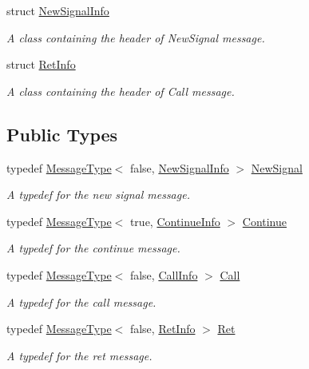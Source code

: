 \begin{DoxyCompactItemize}
struct \hyperlink{struct_message_1_1_new_signal_info}{New\+Signal\+Info}
\begin{DoxyCompactList}\small\item\em A class containing the header of New\+Signal message. \end{DoxyCompactList}\item 
struct \hyperlink{struct_message_1_1_ret_info}{Ret\+Info}
\begin{DoxyCompactList}\small\item\em A class containing the header of Call message. \end{DoxyCompactList}\end{DoxyCompactItemize}
\subsection*{Public Types}
\begin{DoxyCompactItemize}
\item 
typedef \hyperlink{struct_message_1_1_message_type}{Message\+Type}$<$ false, \hyperlink{struct_message_1_1_new_signal_info}{New\+Signal\+Info} $>$ \hyperlink{class_message_a9f57a1ee0e722668e9101b737d7c9844}{New\+Signal}
\begin{DoxyCompactList}\small\item\em A typedef for the new signal message. \end{DoxyCompactList}\item 
typedef \hyperlink{struct_message_1_1_message_type}{Message\+Type}$<$ true, \hyperlink{struct_message_1_1_continue_info}{Continue\+Info} $>$ \hyperlink{class_message_a04de61b84a209cdf372b6f53f3adf7c4}{Continue}
\begin{DoxyCompactList}\small\item\em A typedef for the continue message. \end{DoxyCompactList}\item 
typedef \hyperlink{struct_message_1_1_message_type}{Message\+Type}$<$ false, \hyperlink{struct_message_1_1_call_info}{Call\+Info} $>$ \hyperlink{class_message_a0fd0ed431cb0d672045d09368a5d2126}{Call}
\begin{DoxyCompactList}\small\item\em A typedef for the call message. \end{DoxyCompactList}\item 
typedef \hyperlink{struct_message_1_1_message_type}{Message\+Type}$<$ false, \hyperlink{struct_message_1_1_ret_info}{Ret\+Info} $>$ \hyperlink{class_message_a146628035f5a0723cb04f7a328858e34}{Ret}
\begin{DoxyCompactList}\small\item\em A typedef for the ret message. \end{DoxyCompactList}\end{DoxyCompactItemize}
